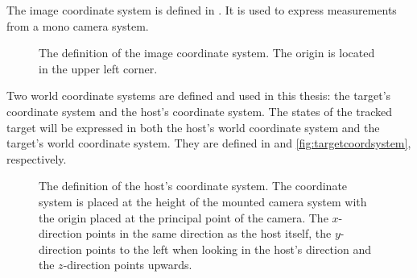 The image coordinate system is defined in .
It is used to \eg express measurements from a mono camera system.

\begin{figure}[!ht]
	\centering
	\caption{\label{fig:imagecoordsystem} The definition of the image coordinate system. The origin is located in the upper left corner.}
\end{figure}

Two world coordinate systems are defined and used in this thesis: the target's coordinate system and the host's coordinate system.
The states of the tracked target will be expressed in both the host's world coordinate system and the target's world coordinate system.
They are defined in  and \ref{fig:targetcoordsystem}, respectively.

\begin{figure}[!ht]
    \centering
    \caption{\label{fig:hostcoordsystem} The definition of the host's coordinate system. The coordinate system is placed at the height of the mounted camera system with the origin placed at the principal point of the camera. The $x$-direction points in the same direction as the host itself, the $y$-direction points to the left when looking in the host's direction and the $z$-direction points upwards.}
\end{figure}

